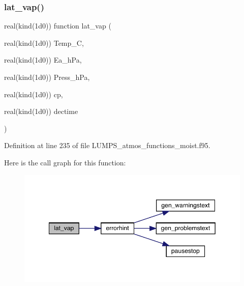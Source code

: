 \subsubsection{\texorpdfstring{lat\+\_\+vap()}{lat\_vap()}}
{\footnotesize\ttfamily real(kind(1d0)) function lat\+\_\+vap (\begin{DoxyParamCaption}\item[{real(kind(1d0))}]{Temp\+\_\+C,  }\item[{real(kind(1d0))}]{Ea\+\_\+h\+Pa,  }\item[{real(kind(1d0))}]{Press\+\_\+h\+Pa,  }\item[{real(kind(1d0))}]{cp,  }\item[{real(kind(1d0))}]{dectime }\end{DoxyParamCaption})}



Definition at line 235 of file L\+U\+M\+P\+S\+\_\+atmos\+\_\+functions\+\_\+moist.\+f95.

Here is the call graph for this function\+:\nopagebreak
\begin{figure}[H]
\begin{center}
\leavevmode
\includegraphics[width=349pt]{_l_u_m_p_s__atmos__functions__moist_8f95_a8101e1e156dd288914e76a4dccb1a08d_cgraph}
\end{center}
\end{figure}
\mbox{\label{_l_u_m_p_s__atmos__functions__moist_8f95_ab3e9a8945e4ba8d534a51c3df7aa7948}} 
